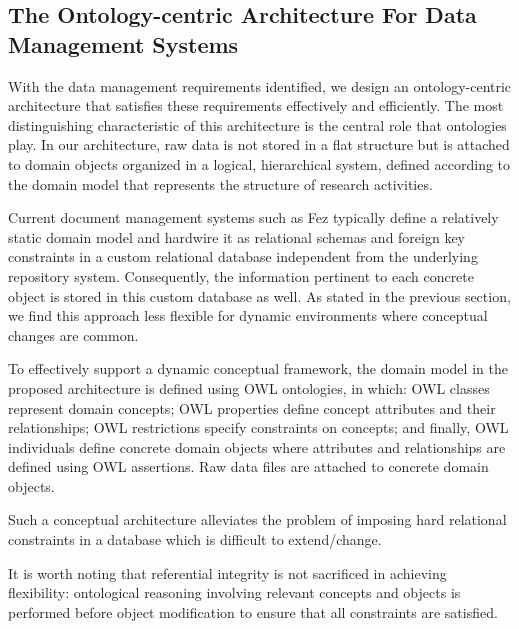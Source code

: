 \documentclass[preprint,12pt]{elsarticle}
\begin{document}
\subsection{The Ontology-centric Architecture For Data Management Systems}\label{sec:arch_desc}
With the data management requirements identified, we design an ontology-centric architecture that satisfies these requirements effectively and efficiently. The most distinguishing characteristic of this architecture is the central role that ontologies play. In our architecture, raw data is not stored in a flat structure but is attached to domain objects organized in a logical, hierarchical system, defined according to the domain model that represents the structure of research activities.

Current document management systems such as Fez typically define a relatively static domain model and hardwire it as relational schemas and foreign key constraints in a custom relational database independent from the underlying repository system. Consequently, the information pertinent to each concrete object is stored in this custom database as well. As stated in the previous section, we find this approach less flexible for dynamic environments where conceptual changes are common.

To effectively support a dynamic conceptual framework, the domain model in the proposed architecture is defined using OWL ontologies, in which: OWL classes represent domain concepts; OWL properties define concept attributes and their relationships; OWL restrictions specify constraints on concepts; and finally, OWL individuals define concrete domain objects where attributes and relationships are defined using OWL assertions. Raw data files are attached to concrete domain objects.

Such a conceptual architecture alleviates the problem of imposing hard relational constraints in a database which is difficult to extend/change.

It is worth noting that referential integrity is not sacrificed in achieving flexibility: ontological reasoning involving relevant concepts and objects is performed before object modification to ensure that all constraints are satisfied.

\end{document}
